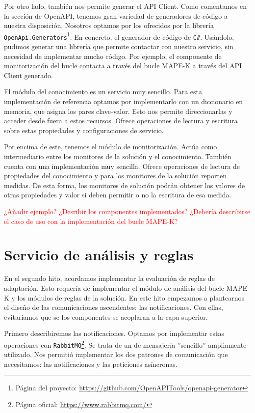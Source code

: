 Por otro lado, también nos permite generar el API Client. Como comentamos en la sección de OpenAPI, tenemos gran variedad de generadores de código a nuestra disposición. Nosotros optamos por los ofrecidos por la librería \texttt{OpenApi.Generators}\footnote{Página del proyecto: \url{https://github.com/OpenAPITools/openapi-generator}}. En concreto, el generador de código de \verb|C#|. Usándolo, pudimos generar una librería que permite contactar con nuestro servicio, sin necesidad de implementar mucho código. Por ejemplo, el componente de monitorización del bucle contacta a través del bucle MAPE-K a través del API Client generado.

El módulo del conocimiento es un servicio muy sencillo. Para esta implementación de referencia optamos por implementarlo con un diccionario en memoria, que asigna los pares clave-valor. Esto nos permite direccionarlas y acceder desde fuera a estos recursos. Ofrece operaciones de lectura y escritura sobre estas propiedades y configuraciones de servicio.

Por encima de este, tenemos el módulo de monitorización. Actúa como intermediario entre los monitores de la solución y el conocimiento. También cuenta con una implementación muy sencilla. Ofrece operaciones de lectura de propiedades del conocimiento y para los monitores de la solución reporten medidas. De esta forma, los monitores de solución podrán obtener los valores de otras propiedades y valor si deben permitir o no la escritura de esa medida.

\textcolor{red}{¿Añadir ejemplo? ¿Desribir los componentes implementados? ¿Debería describirse el caso de uso con la implementación del bucle MAPE-K?}

\section{Servicio de análisis y reglas}
\label{sec:implementacion-modulo-reglas}

En el segundo hito, acordamos implementar la evaluación de reglas de adaptación. Esto requería de implementar el módulo de análisis del bucle MAPE-K y los módulos de reglas de la solución. En este hito empezamos a plantearnos el diseño de las comunicaciones ascendentes: las notificaciones. Con ellas, evitaríamos que se los componentes se acoplaran a la capa superior.

Primero describiremos las notificaciones. Optamos por implementar estas operaciones con \texttt{RabbitMQ}\footnote{Página oficial: \url{https://www.rabbitmq.com/}}. Se trata de un  de mensajería ''sencillo'' ampliamente utilizado. \cite{newmanBuildingMicroservicesDesigning2021} Nos permitió implementar los dos patrones de comunicación que necesitamos: las notificaciones y las peticiones asíncronas.

